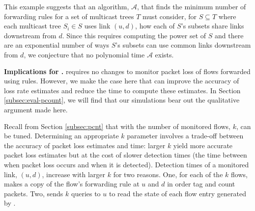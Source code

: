 This example suggests that an algorithm, $\mathcal{A}$, that finds the minimum number of forwarding rules for a set of multicast trees $T$ 
must consider, for $S \subseteq T$ where each multicast tree $S_i \in S$ uses link $(u,d)$, how each of $S$'s subsets share links downstream from $d$.
Since this requires computing the power set of $S$ and there are an exponential number of ways $S$'s subsets can use common links downstream from $d$,
we conjecture that no polynomial time $\mathcal{A}$ exists. %







{\bf Implications for \pcnts.}
\pcnt requires no changes to monitor packet loss of flows forwarded using \merge rules. However, we make 
the case here that \merge can improve the accuracy of \pcnt loss rate estimates and reduce the time to compute these estimates.  In Section
\ref{subsec:eval-pcount}, we will find that our simulations bear out the qualitative argument made here.

Recall from Section \ref{subsec:pcnt} that with \pcnt the number of monitored flows, $k$, can be tuned.
Determining an appropriate $k$ parameter involves a trade-off between the accuracy of packet loss estimates and time: larger $k$ yield more accurate packet loss estimates
but at the cost of slower detection times (the time between when packet loss occurs and when it is detected). Detection times of a monitored link, $(u,d)$, increase with larger $k$
for two reasons. One, for each of the $k$ flows, \pcnt makes a copy of the flow's forwarding rule at $u$ and $d$ in order tag and count packets.  Two, 
\pcnt sends $k$ queries to $u$ to read the state of each flow entry generated by \pcnts. %

